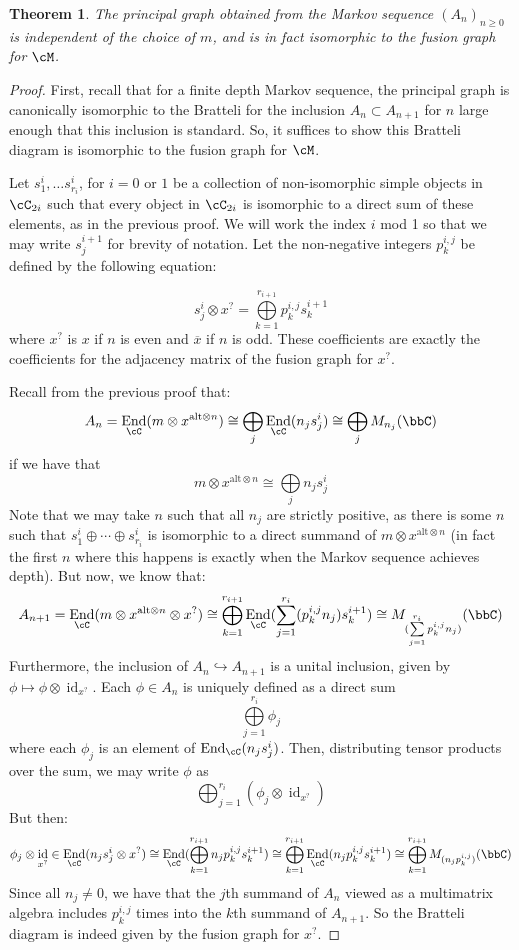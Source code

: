 \documentclass[11pt]{article}
\theoremstyle{plain}
\newtheorem{thm}{Theorem}[]
\theoremstyle{definition}
\DeclareMathOperator{\End}{End}
\DeclareMathOperator{\id}{id}
\newcommand{\xalt}{x^{\text{alt}\otimes n}}
\begin{document}
\begin{thm}
The principal graph obtained from the Markov sequence $(A_n)_{n\geq 0}$ is independent of the choice of $m$, and is in fact isomorphic to the fusion graph for $\cM$.
\end{thm}

\begin{proof}
First, recall that for a finite depth Markov sequence, the principal graph is canonically isomorphic to the Bratteli for the inclusion $A_n\subset A_{n+1}$ for $n$ large enough that this inclusion is standard. So, it suffices to show this Bratteli diagram is isomorphic to the fusion graph for $\cM$. 

Let $s^i_1,\ldots s^i_{r_i}$, for $i=0$ or $1$ be a collection of non-isomorphic simple objects in $\cC_{2i}$ such that every object in $\cC_{2i}$ is isomorphic to a direct sum of these elements, as in the previous proof. 
	We will work the index $i$ mod 1 so that we may write $s^{i+1}_j$ for brevity of notation. %
	Let the non-negative integers $p^{i,j}_k$ be defined by the following equation:

$$s^i_j\otimes x^{?}=\bigoplus\limits_{k=1}^{r_{i+1}}p^{i,j}_ks^{i+1}_k$$
where $x^{?}$ is $x$ if $n$ is even and $\overline{x}$ if $n$ is odd. %
These coefficients are exactly the coefficients for the adjacency matrix of the fusion graph for $x^{?}$.

Recall from the previous proof that:
$$A_n=\End_{\cC}(m\otimes\xalt)\cong \bigoplus\limits_{j}\End_{\cC}(n_j s^i_j) \cong \bigoplus\limits_{j}M_{n_j}(\bbC)$$
if we have that 
$$m \otimes \xalt \cong \bigoplus\limits_{j}n_js^i_j$$
Note that we may take $n$ such that all $n_j$ are strictly positive, as there is some $n$ such that $s^{i}_1\oplus\cdots \oplus s^{i}_{r_i}$ is isomorphic to a direct summand of $m\otimes \xalt$ (in fact the first $n$ where this happens is exactly when the Markov sequence achieves depth). But now, we know that:
$$A_{n+1}=\End_{\cC}(m\otimes\xalt\otimes x^{?})\cong \bigoplus\limits_{k=1}^{r_{i+1}}\End_{\cC}(\sum\limits_{j=1}^{r_i}(p^{i,j}_kn_j)s^{i+1}_k)\cong M_{(\sum\limits_{j=1}^{r_i}p^{i,j}_k n_j)}(\bbC)$$
Furthermore, the inclusion of $A_n \hookrightarrow A_{n+1}$ is a unital inclusion, given by $\phi \mapsto \phi \otimes \id_{x^{?}}$. Each $\phi \in A_n$ is uniquely defined as a direct sum 
$$\bigoplus\limits_{j=1}^{r_i}\phi_j$$
where each $\phi_j$ is an element of $\End_{\cC}(n_js^{i}_j)$. Then, distributing tensor products over the sum, we may write $\phi$ as 
$$\bigoplus_{j=1}^{r_i}(\phi_j \otimes \id_{x^{?}})$$
But then:
$$\phi_j \otimes \id_{x^{?}}\in \End_{\cC}(n_js^{i}_j\otimes x^{?})\cong \End_{\cC}(\bigoplus\limits_{k=1}^{r_{i+1}}n_jp^{i,j}_ks^{i+1}_k)\cong \bigoplus\limits_{k=1}^{r_{i+1}}\End_{\cC}(n_jp^{i,j}_ks^{i+1}_k)\cong \bigoplus\limits_{k=1}^{r_{i+1}}M_{(n_jp^{i,j}_k)}(\bbC)$$
Since all $n_j\neq 0$, we have that the $j$th summand of $A_n$ viewed as a multimatrix algebra includes $p^{i,j}_k$ times into the $k$th summand of $A_{n+1}$. So the Bratteli diagram is indeed given by the fusion graph for $x^{?}$.

\end{proof}
\end{document}
